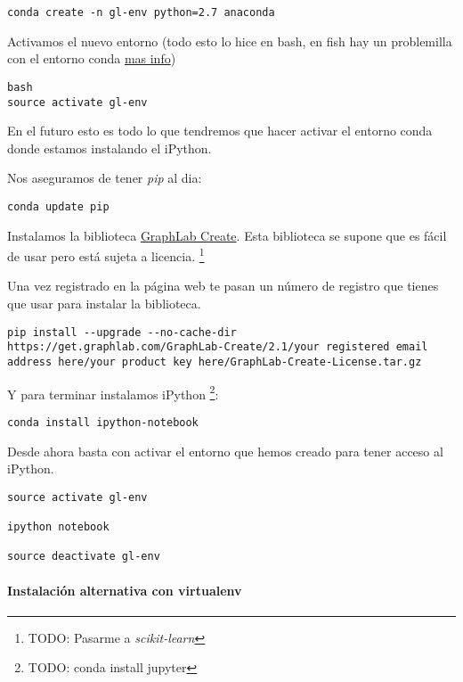 \documentclass[12pt,spanish,]{article}
\let\oldparagraph\paragraph
\renewcommand{\paragraph}[1]{\oldparagraph{#1}\mbox{}}
\begin{document}
\begin{verbatim}
conda create -n gl-env python=2.7 anaconda 
\end{verbatim}

Activamos el nuevo entorno (todo esto lo hice en bash, en fish hay un
problemilla con el entorno conda
\href{https://penandpants.com/2014/02/28/using-conda-environments-and-the-fish-shell/}{mas
info})

\begin{verbatim}
bash
source activate gl-env
\end{verbatim}

En el futuro esto es todo lo que tendremos que hacer activar el entorno
conda donde estamos instalando el iPython.

Nos aseguramos de tener \emph{pip} al dia:

\begin{verbatim}
conda update pip
\end{verbatim}

Instalamos la biblioteca
\href{https://turi.com/products/create/}{GraphLab Create}. Esta
biblioteca se supone que es fácil de usar pero está sujeta a licencia.
\footnote{TODO: Pasarme a \emph{scikit-learn}}

Una vez registrado en la página web te pasan un número de registro que
tienes que usar para instalar la biblioteca.

\begin{verbatim}
pip install --upgrade --no-cache-dir https://get.graphlab.com/GraphLab-Create/2.1/your registered email address here/your product key here/GraphLab-Create-License.tar.gz
\end{verbatim}

Y para terminar instalamos iPython \footnote{TODO: conda install jupyter}:

\begin{verbatim}
conda install ipython-notebook
\end{verbatim}

Desde ahora basta con activar el entorno que hemos creado para tener
acceso al iPython.

\begin{verbatim}
source activate gl-env

ipython notebook

source deactivate gl-env
\end{verbatim}

\paragraph{Instalación alternativa con
virtualenv}\label{instalaciuxf3n-alternativa-con-virtualenv}
\end{document}
